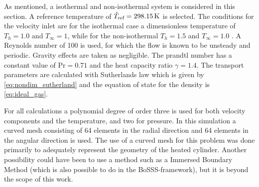 As mentioned, a isothermal and non-isothermal system is considered in this section. A reference temperature of $\hat T_{\text{ref}} = \SI{298.15}{\kelvin}$ is selected. The conditions for the velocity inlet are for the isothermal case a dimensionless temperature of $T_h = 1.0$ and $T_\infty = 1$, while for the non-isothermal $T_h = 1.5$ and $T_\infty = 1.0$ . A Reynolds number of 100 is used, for which the flow is known to be unsteady and periodic. Gravity effects are taken as negligible. The prandtl number has a constant value of $\text{Pr} = 0.71$ and the heat capacity ratio $\gamma = 1.4$. The transport parameters are calculated with Sutherlands law which is given by \cref{eq:nondim_sutherland} and the equation of state for the density is \cref{eq:ideal_gas}.

For all calculations a polynomial degree of order three is used for both velocity components and the temperature, and two for pressure. In this simulation a curved mesh consisting of 64 elements in the radial direction and 64 elements in the angular direction is used. The use of a curved mesh for this problem was done primarily to adequately represent the geometry of the heated cylinder. Another possibility could have been to use a method such as a Immersed Boundary Method (which is also possible to do in the BoSSS-framework), but it is beyond the scope of this work.

